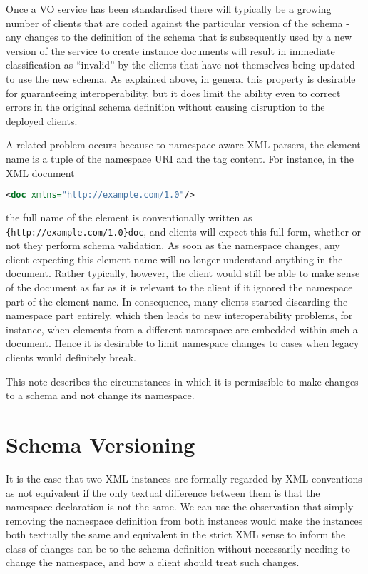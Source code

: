 \documentclass[10pt,a4paper]{ivoa}
\begin{document}
Once a VO service has been standardised there will typically be a growing number
of clients that are coded against the particular version of the
schema - any changes to the definition of the schema that is subsequently used
by a new version of the service to create instance documents will result in
immediate classification as ``invalid'' by the clients that have not themselves being
updated to use the new schema.
As explained above, in general this property is desirable for guaranteeing interoperability, but it does limit
the ability even to correct errors in the original schema definition without
causing disruption to the deployed clients. 

A related problem occurs because to namespace-aware XML parsers, the
element name is a tuple of the namespace URI and the tag content.  For
instance, in the XML document

\begin{lstlisting}[language=XML]
<doc xmlns="http://example.com/1.0"/>
\end{lstlisting}

the full name of the element is conventionally written as
\verb|{http://example.com/1.0}doc|, and clients will expect this full
form, whether or not they perform schema validation.  As soon as the
namespace changes, any client expecting this element name will no longer
understand anything in the document.  Rather typically, however, the
client would still be able to make sense of the document as far as it is
relevant to the client if it ignored the namespace part of the element
name.  In consequence, many clients started discarding the namespace
part entirely, which then leads to new interoperability problems, for
instance, when elements from a different namespace are embedded within
such a document.  Hence it is desirable to limit namespace changes to
cases when legacy clients would definitely break.

This note describes the
circumstances in which it is permissible to make changes to a schema and not
change its namespace.


\section{Schema Versioning}
It is the case that two XML instances are formally regarded by XML
conventions as not equivalent if the only textual difference between them is
that the namespace declaration is not the same. We
can use the observation that simply removing the namespace definition from both instances
would make the instances both textually the same and equivalent in the strict
XML sense to inform the class of changes can be to the schema definition without
necessarily needing to change the namespace, and how a client should treat such
changes.
\end{document}
